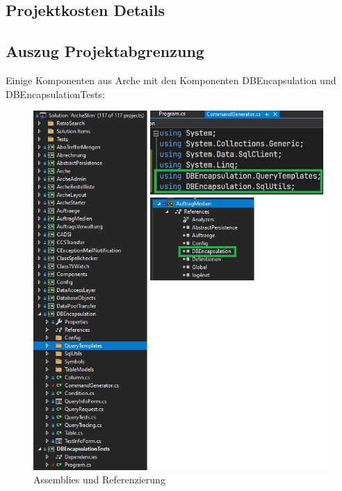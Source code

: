 \documentclass[11pt,toc=sectionentrywithoutdots, 
headheight=44pt, headings=optiontoheadandtoc, hyperfootnotes=false, hypertexnames=false]{scrartcl}
\begin{document}
\subsection{Projektkosten Details}
\blindtext\blindtext

\subsection{Auszug Projektabgrenzung}
 \label{fig:Assemblies}
Einige Komponenten aus Arche mit den Komponenten DBEncapsulation und DBEncapsulationTests:
 \begin{figure}[htp]
 \centering

	\includegraphics[scale=0.7]{Assemblies.png}
	 \caption{Assemblies und Referenzierung}
 \end{figure}
 \clearpage
 

 
 
\end{document}
